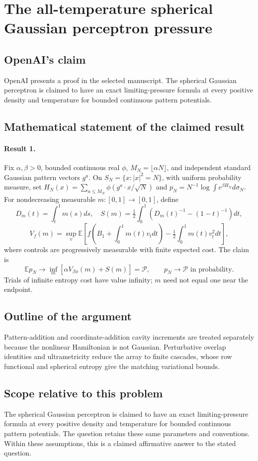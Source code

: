 \documentclass[11pt]{article}
\begin{document}
\section*{The all-temperature spherical Gaussian perceptron pressure}

\subsection{OpenAI's claim}
OpenAI presents a proof in the selected manuscript. The spherical Gaussian perceptron is claimed to have an exact limiting-pressure formula at every positive density and temperature for bounded continuous pattern potentials.

\subsection{Mathematical statement of the claimed result}
\paragraph{Result 1.} Fix \(\alpha,\beta>0\), bounded continuous real \(\phi\), \(M_N=\lfloor\alpha N\rfloor\), and independent standard Gaussian pattern vectors \(g^a\). On \(S_N=\{x:|x|^2=N\}\), with uniform probability measure, set \(H_N(x)=\sum_{a\le M_N}\phi(g^a\cdot x/\sqrt N)\) and \(p_N=N^{-1}\log\int e^{\beta H_N}d\sigma_N\). For nondecreasing measurable \(m:[0,1]\to[0,1]\), define
\[
 D_m(t)=\int_t^1m(s)ds,\quad
 S(m)=\tfrac12\int_0^1\left(D_m(t)^{-1}-(1-t)^{-1}\right)dt,
\]
\[
 V_f(m)=\sup_v\mathbb E\left[f(B_1+\int_0^1m(t)v_tdt)-\tfrac12\int_0^1m(t)v_t^2dt\right],
\]
where controls are progressively measurable with finite expected cost. The claim is
\[
 \mathbb E p_N\to\inf_m[\alpha V_{\beta\phi}(m)+S(m)]=\mathcal P,
 \qquad p_N\to\mathcal P\text{ in probability}.
\]
Trials of infinite entropy cost have value infinity; \(m\) need not equal one near the endpoint.

\subsection{Outline of the argument}
Pattern-addition and coordinate-addition cavity increments are treated separately because the nonlinear Hamiltonian is not Gaussian. Perturbative overlap identities and ultrametricity reduce the array to finite cascades, whose row functional and spherical entropy give the matching variational bounds.

\subsection{Scope relative to this problem}
The spherical Gaussian perceptron is claimed to have an exact limiting-pressure formula at every positive density and temperature for bounded continuous pattern potentials. The question retains these same parameters and conventions. Within these assumptions, this is a claimed affirmative answer to the stated question.
\end{document}
